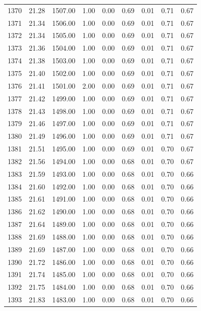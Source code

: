\documentclass{article}\usepackage[]{graphicx}\usepackage[]{color}
\begin{document}
\begin{longtable}{rrrrrrrrr}
  1370 & 21.28 & 1507.00 & 1.00 & 0.00 & 0.69 & 0.01 & 0.71 & 0.67 \\ 
  1371 & 21.34 & 1506.00 & 1.00 & 0.00 & 0.69 & 0.01 & 0.71 & 0.67 \\ 
  1372 & 21.34 & 1505.00 & 1.00 & 0.00 & 0.69 & 0.01 & 0.71 & 0.67 \\ 
  1373 & 21.36 & 1504.00 & 1.00 & 0.00 & 0.69 & 0.01 & 0.71 & 0.67 \\ 
  1374 & 21.38 & 1503.00 & 1.00 & 0.00 & 0.69 & 0.01 & 0.71 & 0.67 \\ 
  1375 & 21.40 & 1502.00 & 1.00 & 0.00 & 0.69 & 0.01 & 0.71 & 0.67 \\ 
  1376 & 21.41 & 1501.00 & 2.00 & 0.00 & 0.69 & 0.01 & 0.71 & 0.67 \\ 
  1377 & 21.42 & 1499.00 & 1.00 & 0.00 & 0.69 & 0.01 & 0.71 & 0.67 \\ 
  1378 & 21.43 & 1498.00 & 1.00 & 0.00 & 0.69 & 0.01 & 0.71 & 0.67 \\ 
  1379 & 21.46 & 1497.00 & 1.00 & 0.00 & 0.69 & 0.01 & 0.71 & 0.67 \\ 
  1380 & 21.49 & 1496.00 & 1.00 & 0.00 & 0.69 & 0.01 & 0.71 & 0.67 \\ 
  1381 & 21.51 & 1495.00 & 1.00 & 0.00 & 0.69 & 0.01 & 0.70 & 0.67 \\ 
  1382 & 21.56 & 1494.00 & 1.00 & 0.00 & 0.68 & 0.01 & 0.70 & 0.67 \\ 
  1383 & 21.59 & 1493.00 & 1.00 & 0.00 & 0.68 & 0.01 & 0.70 & 0.66 \\ 
  1384 & 21.60 & 1492.00 & 1.00 & 0.00 & 0.68 & 0.01 & 0.70 & 0.66 \\ 
  1385 & 21.61 & 1491.00 & 1.00 & 0.00 & 0.68 & 0.01 & 0.70 & 0.66 \\ 
  1386 & 21.62 & 1490.00 & 1.00 & 0.00 & 0.68 & 0.01 & 0.70 & 0.66 \\ 
  1387 & 21.64 & 1489.00 & 1.00 & 0.00 & 0.68 & 0.01 & 0.70 & 0.66 \\ 
  1388 & 21.69 & 1488.00 & 1.00 & 0.00 & 0.68 & 0.01 & 0.70 & 0.66 \\ 
  1389 & 21.69 & 1487.00 & 1.00 & 0.00 & 0.68 & 0.01 & 0.70 & 0.66 \\ 
  1390 & 21.72 & 1486.00 & 1.00 & 0.00 & 0.68 & 0.01 & 0.70 & 0.66 \\ 
  1391 & 21.74 & 1485.00 & 1.00 & 0.00 & 0.68 & 0.01 & 0.70 & 0.66 \\ 
  1392 & 21.75 & 1484.00 & 1.00 & 0.00 & 0.68 & 0.01 & 0.70 & 0.66 \\ 
  1393 & 21.83 & 1483.00 & 1.00 & 0.00 & 0.68 & 0.01 & 0.70 & 0.66 \\ 

\end{longtable}
\end{document}
